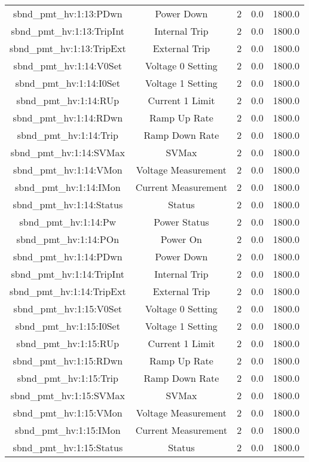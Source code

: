 \begin{center}
\begin{longtable}{c | c c c c }
sbnd\_pmt\_hv:1:13:PDwn & Power Down & 2 & 0.0 & 1800.0\\ 
sbnd\_pmt\_hv:1:13:TripInt & Internal Trip & 2 & 0.0 & 1800.0\\ 
sbnd\_pmt\_hv:1:13:TripExt & External Trip & 2 & 0.0 & 1800.0\\ 
sbnd\_pmt\_hv:1:14:V0Set & Voltage 0 Setting & 2 & 0.0 & 1800.0\\ 
sbnd\_pmt\_hv:1:14:I0Set & Voltage 1 Setting & 2 & 0.0 & 1800.0\\ 
sbnd\_pmt\_hv:1:14:RUp & Current 1 Limit & 2 & 0.0 & 1800.0\\ 
sbnd\_pmt\_hv:1:14:RDwn & Ramp Up Rate & 2 & 0.0 & 1800.0\\ 
sbnd\_pmt\_hv:1:14:Trip & Ramp Down Rate & 2 & 0.0 & 1800.0\\ 
sbnd\_pmt\_hv:1:14:SVMax & SVMax & 2 & 0.0 & 1800.0\\ 
sbnd\_pmt\_hv:1:14:VMon & Voltage Measurement & 2 & 0.0 & 1800.0\\ 
sbnd\_pmt\_hv:1:14:IMon & Current Measurement & 2 & 0.0 & 1800.0\\ 
sbnd\_pmt\_hv:1:14:Status & Status & 2 & 0.0 & 1800.0\\ 
sbnd\_pmt\_hv:1:14:Pw & Power Status & 2 & 0.0 & 1800.0\\ 
sbnd\_pmt\_hv:1:14:POn & Power On & 2 & 0.0 & 1800.0\\ 
sbnd\_pmt\_hv:1:14:PDwn & Power Down & 2 & 0.0 & 1800.0\\ 
sbnd\_pmt\_hv:1:14:TripInt & Internal Trip & 2 & 0.0 & 1800.0\\ 
sbnd\_pmt\_hv:1:14:TripExt & External Trip & 2 & 0.0 & 1800.0\\ 
sbnd\_pmt\_hv:1:15:V0Set & Voltage 0 Setting & 2 & 0.0 & 1800.0\\ 
sbnd\_pmt\_hv:1:15:I0Set & Voltage 1 Setting & 2 & 0.0 & 1800.0\\ 
sbnd\_pmt\_hv:1:15:RUp & Current 1 Limit & 2 & 0.0 & 1800.0\\ 
sbnd\_pmt\_hv:1:15:RDwn & Ramp Up Rate & 2 & 0.0 & 1800.0\\ 
sbnd\_pmt\_hv:1:15:Trip & Ramp Down Rate & 2 & 0.0 & 1800.0\\ 
sbnd\_pmt\_hv:1:15:SVMax & SVMax & 2 & 0.0 & 1800.0\\ 
sbnd\_pmt\_hv:1:15:VMon & Voltage Measurement & 2 & 0.0 & 1800.0\\ 
sbnd\_pmt\_hv:1:15:IMon & Current Measurement & 2 & 0.0 & 1800.0\\ 
sbnd\_pmt\_hv:1:15:Status & Status & 2 & 0.0 & 1800.0\\ 

\end{longtable}
\end{center}
